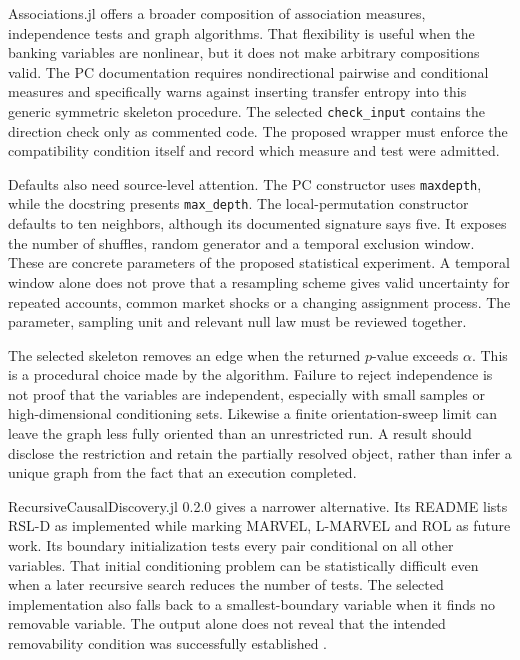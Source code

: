 Associations.jl offers a broader composition of association measures,
independence tests and graph algorithms. That flexibility is useful when the
banking variables are nonlinear, but it does not make arbitrary compositions
valid. The PC documentation requires nondirectional pairwise and conditional
measures and specifically warns against inserting transfer entropy into this
generic symmetric skeleton procedure. The selected \texttt{check\_input}
contains the direction check only as commented code. The proposed wrapper
must enforce the compatibility condition itself and record which measure and
test were admitted\citep{exec13_other_associations}.

Defaults also need source-level attention. The PC constructor uses
\texttt{maxdepth}, while the docstring presents \texttt{max\_depth}.
The local-permutation constructor defaults to ten neighbors, although its
documented signature says five. It exposes the number of shuffles, random
generator and a temporal exclusion window. These are concrete parameters of
the proposed statistical experiment. A temporal window alone does not prove
that a resampling scheme gives valid uncertainty for repeated accounts,
common market shocks or a changing assignment process. The parameter,
sampling unit and relevant null law must be reviewed together.

The selected skeleton removes an edge when the returned $p$-value exceeds
$\alpha$. This is a procedural choice made by the algorithm. Failure to
reject independence is not proof that the variables are independent,
especially with small samples or high-dimensional conditioning sets.
Likewise a finite orientation-sweep limit can leave the graph less fully
oriented than an unrestricted run. A result should disclose the restriction
and retain the partially resolved object, rather than infer a unique graph
from the fact that an execution completed.

RecursiveCausalDiscovery.jl 0.2.0 gives a narrower alternative. Its README
lists RSL-D as implemented while marking MARVEL, L-MARVEL and ROL as future
work. Its boundary initialization tests every pair conditional on all other
variables. That initial conditioning problem can be statistically difficult
even when a later recursive search reduces the number of tests. The selected
implementation also falls back to a smallest-boundary variable when it finds
no removable variable. The output alone does not reveal that the intended
removability condition was successfully established
\citep{exec13_other_recursive}.

